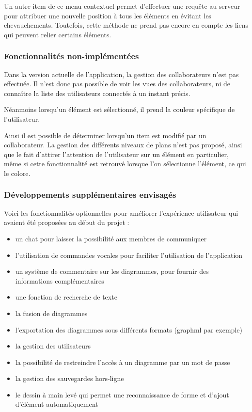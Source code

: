 Un autre item de ce menu contextuel permet d'effectuer une requête au serveur pour attribuer une nouvelle position à tous les éléments en évitant les chevauchements. Toutefois, cette méthode ne prend pas encore en compte les liens qui peuvent relier certains éléments.

\subsubsection{Fonctionnalités non-implémentées}
Dans la version actuelle de l'application, la gestion des collaborateurs n'est pas effectuée.
Il n'est donc pas possible de voir les vues des collaborateurs, ni de connaître la liste des utilisateurs connectés à un instant précis.

Néanmoins lorsqu'un élément est sélectionné, il prend la couleur spécifique de l'utilisateur.

Ainsi il est possible de déterminer lorsqu'un item est modifié par un collaborateur. 
La gestion des différents niveaux de plans n'est pas proposé, ainsi que le fait d'attirer l'attention de l'utilisateur sur un élément en particulier, même si cette fonctionnalité est retrouvé lorsque l'on sélectionne l'élément, ce qui le colore. 

\subsubsection{Développements supplémentaires envisagés}
Voici les fonctionnalités optionnelles pour améliorer l'expérience utilisateur qui avaient été proposées au début du projet :
\begin{itemize}
\item un chat pour laisser la possibilité aux membres de communiquer
\item l'utilisation de commandes vocales pour faciliter l'utilisation de l'application
\item un système de commentaire sur les diagrammes, pour fournir des informations complémentaires
\item une fonction de recherche de texte
\item la fusion de diagrammes
\item l'exportation des diagrammes sous différents formats (graphml par exemple)
\item la gestion des utilisateurs
\item la possibilité de restreindre l'accès à un diagramme par un mot de passe
\item la gestion des sauvegardes hors-ligne
\item le dessin à main levé qui permet une reconnaissance de forme et d'ajout d'élément automatiquement
\end{itemize}

